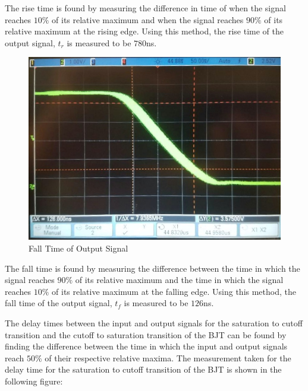 The rise time is found by measuring the difference in time of when the signal reaches $10\%$ of its relative maximum and when the signal reaches $90\%$ of its relative maximum at the rising edge. Using this method, the rise time of the output signal, $t_r$ is measured to be $780$\si{\nano\second}.

\FloatBarrier
\begin{figure}[h!]
	\centering
	\includegraphics[scale=0.34]{../images/inverter_tf.jpeg}
	\caption{Fall Time of Output Signal}
	\label{fig:inverter_tf}
\end{figure}
\FloatBarrier

The fall time is found by measuring the difference between the time in which the signal reaches $90\%$ of its relative maximum and the time in which the signal reaches $10\%$ of its relative maximum at the falling edge. Using this method, the fall time of the output signal, $t_f$ is measured to be $126$\si{\nano\second}.

The delay times between the input and output signals for the saturation to cutoff transition and the cutoff to saturation transition of the BJT can be found by finding the difference between the time in which the input and output signals reach $50\%$ of their respective relative maxima. The measurement taken for the delay time for the saturation to cutoff transition of the BJT is shown in the following figure:

